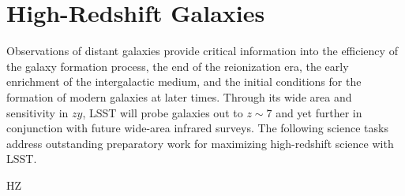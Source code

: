\section{High-Redshift Galaxies}\label{sec:tasks:high_z}  

{\justify
Observations of distant galaxies provide critical information
into the efficiency of the galaxy formation process, the end
of the reionization era, the early enrichment of the intergalactic
medium, and the initial conditions for the formation of modern
galaxies at later times. Through its wide area and sensitivity
in $zy$, LSST will probe galaxies out to $z\sim7$ and 
yet further in conjunction with future wide-area infrared surveys.
The following science tasks address outstanding preparatory work
for maximizing high-redshift science with LSST.

\begin{tasklist}{HZ}


\end{tasklist}}
